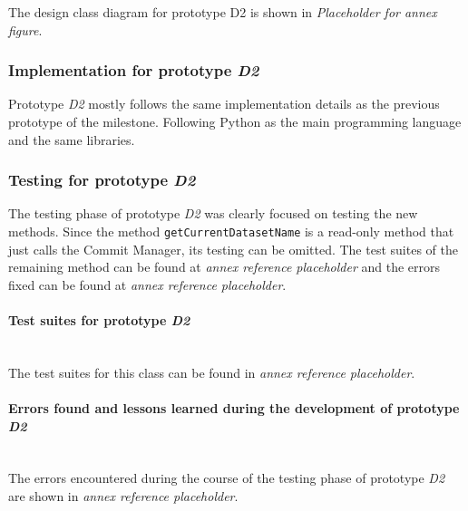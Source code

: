 The design class diagram for prototype D2 is shown in \emph{Placeholder for annex figure}.

\subsubsection{Implementation for prototype \emph{D2}}

Prototype \emph{D2} mostly follows the same implementation details as the previous prototype of the milestone. Following Python as the main programming language and the same
libraries.

\subsubsection{Testing for prototype \emph{D2}}

The testing phase of prototype \emph{D2} was clearly focused on testing the new methods. Since the method \texttt{getCurrentDatasetName} is a read-only 
method that just calls the Commit Manager, its testing can be omitted. The test suites of the remaining method can be found at \emph{annex reference placeholder} and the errors fixed can be found at \emph{annex reference placeholder}.

\paragraph{Test suites for prototype \emph{D2}}\mbox{}\\

The test suites for this class can be found in \emph{annex reference placeholder}.

\paragraph{Errors found and lessons learned during the development of prototype \emph{D2}}\mbox{}\\

The errors encountered during the course of the testing phase of prototype \emph{D2} are shown in \emph{annex reference placeholder}.

